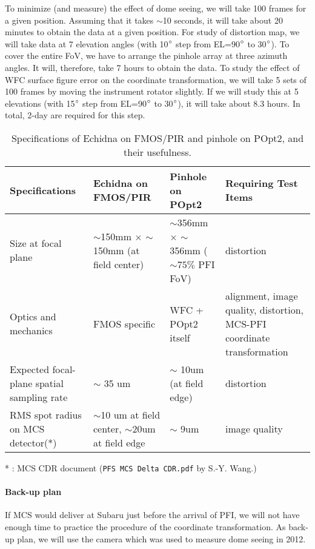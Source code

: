 To minimize (and measure) the effect of dome seeing, we will take 100 frames for a given position.
Assuming that it takes $\sim$10 seconds, it will take about 20 minutes to obtain the data at a given position.
For study of distortion map, we will take data at 7 elevation angles (with 10$^\circ$ step from EL=90$^\circ$ to 30$^\circ$).
To cover the entire FoV, we have to arrange the pinhole array at three azimuth angles.
It will, therefore, take 7 hours to obtain the data.
To study the effect of WFC surface figure error on the coordinate transformation, we will take 5 sets of 100 frames by moving the instrument rotator slightly.
If we will study this at 5 elevations (with 15$^\circ$ step from EL=90$^\circ$ to 30$^\circ$), it will take about 8.3 hours.
In total, 2-day are required for this step.

\begin{table}[!ht]
\begin{center}
\caption{Specifications of Echidna on FMOS/PIR and pinhole on POpt2, and their usefulness.
}
\label{tbl:fmos_pinhole}
\begin{tabular}{p{35mm}|*{3}{|p{40mm}}} \hline
Specifications	& Echidna on FMOS/PIR & Pinhole on POpt2 & Requiring Test Items\\ \hline \hline
Size at focal plane	& $\sim$150mm $\times$ $\sim$150mm (at field center)		& $\sim$356mm $\times$ $\sim$356mm ($\sim 75 \%$ PFI FoV)	& distortion \\ \hline
Optics and mechanics	& FMOS specific	& WFC + POpt2 itself	& alignment, image quality, distortion, MCS-PFI coordinate transformation \\  \hline
Expected focal-plane spatial sampling rate	& $\sim$ 35 um	& $\sim$ 10um (at field edge)	& distortion \\ \hline
RMS spot radius on MCS detector(*)	& $\sim$10 um at field center, $\sim$20um at field edge	& $\sim$ 9um	& image quality \\ \hline
\end{tabular} 
\end{center}
* : MCS CDR document ({\tt PFS MCS Delta CDR.pdf} by S.-Y. Wang.)
\end{table}

\paragraph{Back-up plan}
If MCS would deliver at Subaru just before the arrival of PFI, we will not have enough time to practice the procedure of the coordinate transformation.
As back-up plan, we will use the camera which was used to measure dome seeing in 2012.

